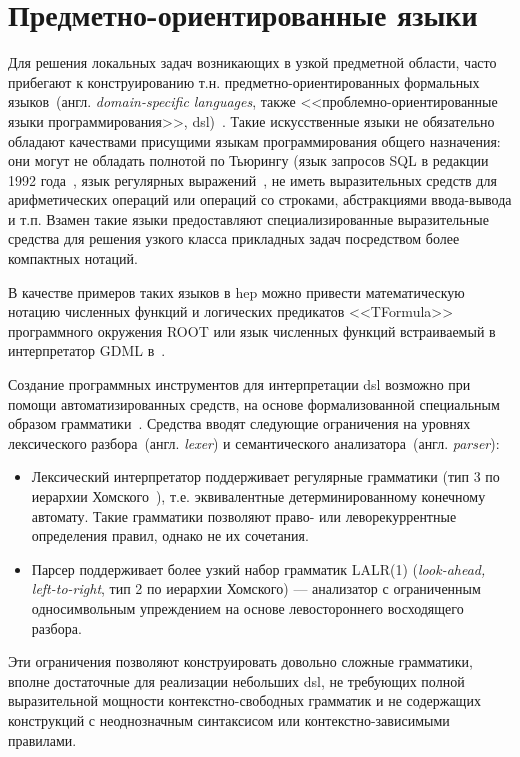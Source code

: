 \section{Предметно-ориентированные языки}

Для решения локальных задач возникающих в узкой предметной области,
часто прибегают к конструированию т.н. предметно-ориентированных
формальных языков~(англ. \emph{domain-specific languages}, также
<<проблемно-ориентированные языки
программирования>>, \acrshort{dsl})~\cite{DSL-Fowler2011}. Такие искусственные
языки не обязательно обладают качествами присущими языкам программирования
общего назначения: они могут не обладать полнотой по Тьюрингу (язык
запросов SQL в редакции 1992 года~\cite{ISO90751992}, язык
регулярных выражений~\cite{thompson1968programming},
не иметь выразительных средств для арифметических операций или операций со
строками, абстракциями ввода-вывода и т.п. Взамен такие языки
предоставляют специализированные выразительные средства для решения узкого
класса прикладных задач посредством более компактных нотаций.

В качестве примеров таких языков в \acrshort{hep} можно привести
математическую нотацию численных функций и логических предикатов
<<TFormula>> программного окружения ROOT \cite{ROOT-framework} или язык численных
функций встраиваемый в интерпретатор GDML в~\cite{Berra2011Geant4SO}.

Создание программных инструментов для интерпретации \acrshort{dsl}
возможно при помощи автоматизированных средств, на основе
формализованной специальным образом грамматики~\cite{alfred2007compilers}.
Средства вводят следующие ограничения на уровнях лексического
разбора~(англ. \emph{lexer}) и семантического анализатора~(англ. \emph{parser}):
\begin{itemize}
    \item Лексический интерпретатор поддерживает регулярные
    грамматики (тип 3 по иерархии Хомского~\cite{chomsky1956three}),
    т.е. эквивалентные детерминированному конечному автомату. Такие грамматики
    позволяют право- или леворекуррентные определения правил, однако
    не их сочетания.
    \item Парсер поддерживает более узкий набор грамматик  LALR(1)
    (\emph{look-ahead, left-to-right}, тип 2 по иерархии Хомского) ---
    анализатор с ограниченным односимвольным упреждением на основе
    левостороннего восходящего разбора.
\end{itemize}
Эти ограничения позволяют конструировать довольно сложные
грамматики, вполне достаточные для реализации небольших \acrshort{dsl},
не требующих полной выразительной мощности контекстно-свободных
грамматик и не содержащих конструкций с неоднозначным синтаксисом
или контекстно-зависимыми правилами.


